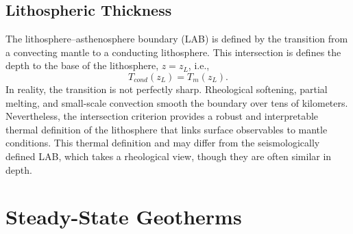 \label{box:adiabat}

\subsection{Lithospheric Thickness}

The lithosphere--asthenosphere boundary (LAB) is defined by the transition from a convecting mantle to a conducting lithosphere.  This intersection is defines the depth to the base of the lithosphere, $z = z_L$, i.e., 
\[
    T_{cond}(z_L) = T_m(z_L).
\]
In reality, the transition is not perfectly sharp. Rheological softening, partial melting, and small-scale convection smooth the boundary over tens of kilometers. Nevertheless, the intersection criterion provides a robust and interpretable thermal definition of the lithosphere that links surface observables to mantle conditions.  This thermal definition and may differ from the seismologically defined LAB, which takes a rheological view, though they are often similar in depth.


\section{Steady-State Geotherms}\label{sec:ss}


